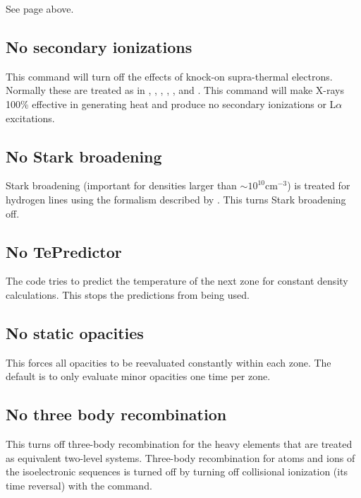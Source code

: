 See page \pageref{sec:CommandNoScatteringOpacity} above.

\subsection{No secondary ionizations}

This command will turn off the effects of knock-on supra-thermal
electrons.
Normally these are treated as in \citet{Spitzer1968},
\citet{Bergeron1971}, \citet{Shull1979}, \citet{Shull1985}, \citet{Xu1991},
and \citet{Dalgarno1999}.
This command
will make X-rays 100\% effective in generating heat and
produce no secondary
ionizations or L$\alpha $ excitations.

\subsection{No Stark broadening}

Stark broadening (important for densities larger than
$\sim 10^{10}\mathrm{cm}^{-3}$) is
treated for hydrogen lines using the formalism described by
\citet{Puetter1981}.
This turns Stark broadening off.

\subsection{No TePredictor}

The code tries to predict the temperature of the next zone for constant
density calculations.
This stops the predictions from being used.

\subsection{No static opacities}

This forces all opacities to be reevaluated constantly within each zone.
The default is to only evaluate minor opacities one time per zone.

\subsection{No three body recombination}

This turns off three-body recombination for the heavy elements that are
treated as equivalent two-level systems.
Three-body recombination for atoms
and ions of the isoelectronic sequences is turned off by turning off
collisional ionization (its time reversal) with the
 command.

